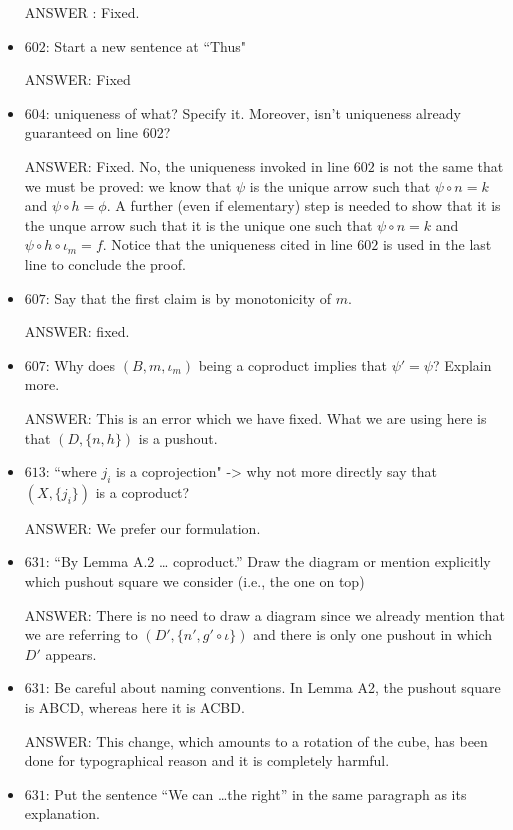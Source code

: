 \documentclass[english,11pt,a4paper]{article}
\begin{document}
\begin{itemize}
ANSWER : Fixed.

\item $602$: Start a new sentence at ``Thus"

ANSWER: Fixed

\item $604$: uniqueness of what? Specify it. Moreover, isn't uniqueness already guaranteed on line 602?

ANSWER: Fixed. No, the uniqueness invoked in line $602$ is not the same that we must be proved: we know that $\psi$ is the unique arrow such that $\psi \circ n=k$ and $\psi \circ h =\phi$. A further (even if elementary) step is needed to show that it is the unque arrow such that it is the unique one such that $\psi \circ n=k$ and $\psi \circ h \circ \iota_m=f$. Notice that the uniqueness cited in line $602$ is used in the last line to conclude the proof.

\item $607$: Say that the first claim is by monotonicity of $m$.

ANSWER: fixed.

\item $607$: Why does $(B,{m,\iota_m})$ being a coproduct implies that $\psi' = \psi$? Explain more.

ANSWER: This is an error which we have fixed. What we are using here is that $(D, \{n, h\})$ is a pushout.

\item $613$: ``where $j_i$ is a coprojection" -> why not more directly say that $(X, \{j_i\})$ is a coproduct?

ANSWER: We prefer our formulation.

\item $631$: ``By Lemma A.2 … coproduct.'' Draw the diagram or mention explicitly which pushout square we consider (i.e., the one on top)

ANSWER: There is no need to draw a diagram since we already mention that we are referring to $(D', \{n', g'\circ \iota\})$ and there is only one pushout in which $D'$ appears.

\item $631$: Be careful about naming conventions. In Lemma A2, the pushout square is ABCD, whereas here it is ACBD.

ANSWER: This change, which amounts to a rotation of the cube, has been done for typographical reason and it is completely harmful.


\item $631$: Put the sentence ``We can \ldots the right'' in the same paragraph as its explanation.


\end{itemize}
\end{document}
